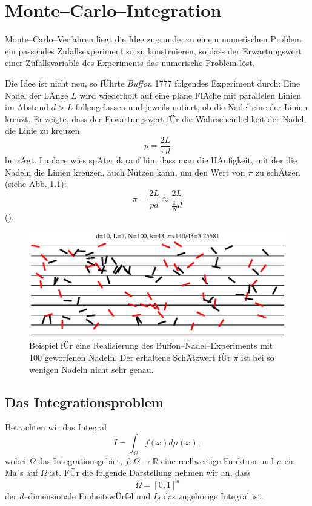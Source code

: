 	\chapter{Monte--Carlo--Integration}\label{chapter:mc_integration}
	Monte--Carlo--Verfahren liegt die Idee zugrunde, zu einem numerischen Problem ein passendes Zufallsexperiment so zu konstruieren, so dass der Erwartungswert einer Zufallsvariable des Experiments das numerische Problem löst.
	
	Die Idee ist nicht neu, so fÜhrte {\em Buffon} 1777 folgendes Experiment durch: Eine Nadel der LÄnge $L$ wird wiederholt auf eine plane FlÄche mit parallelen Linien im Abstand $d>L$ fallengelassen und jeweils notiert, ob die Nadel eine der Linien kreuzt. Er zeigte, dass der Erwartungswert fÜr die Wahrscheinlichkeit der Nadel, die Linie zu kreuzen $$p=\frac{2L}{\pi d}$$ betrÄgt. Laplace wies spÄter darauf hin, dass  man die HÄufigkeit, mit der die Nadeln die Linien kreuzen, auch Nutzen kann, um den Wert von $\pi$ zu schÄtzen (siehe Abb. \ref{fig:buffon}): $$\pi=\frac{2L}{p d}\approx \frac{2L}{\frac{k}{N}d}$$
	().
	\begin{figure}
		\centering
		\includegraphics[height=0.3\textheight]{buffonsneedles.eps}
		\caption{Beispiel fÜr eine Realisierung des Buffon--Nadel--Experiments mit 100 geworfenen Nadeln. Der erhaltene SchÄtzwert fÜr $\pi$ ist bei so wenigen Nadeln nicht sehr genau.}
		\label{fig:buffon}
	\end{figure}
	
	\section{Das Integrationsproblem}\label{subsec:integrationsproblem}
	Betrachten wir das Integral
	\begin{equation}
		I=\int_\Omega f(x) d\mu(x),
		\label{eq:integration_problem}
	\end{equation}
	wobei $\Omega$ das Integrationsgebiet, $f : \Omega \to \mathbb{R}$ eine reellwertige Funktion und $\mu$ ein Ma"s auf $\Omega$ ist. FÜr die folgende Darstellung nehmen wir an, dass $$\Omega=[0,1]^d$$ der $d$--dimensionale EinheitswÜrfel und $I_d$ das zugehörige Integral ist.
